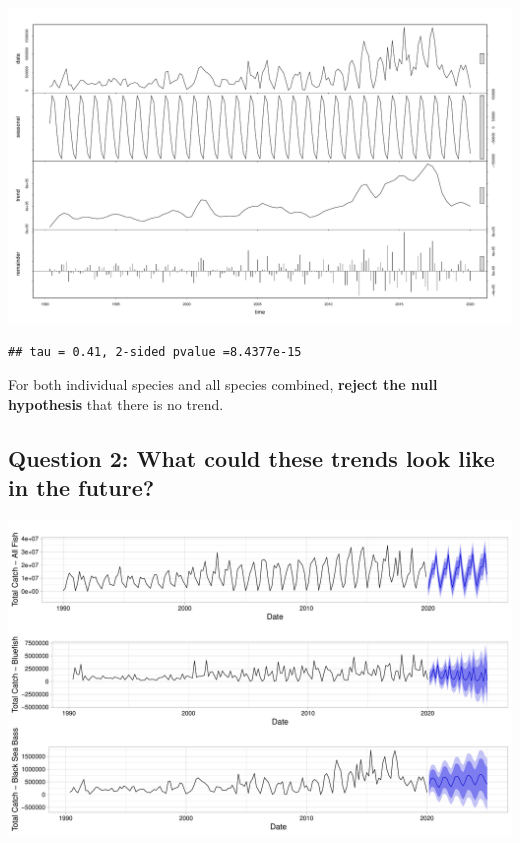 \documentclass[
  12pt,
]{article}
\begin{document}
\includegraphics{Report_FishTrends_files/figure-latex/unnamed-chunk-5-1.pdf}

\begin{verbatim}
## tau = 0.41, 2-sided pvalue =8.4377e-15
\end{verbatim}

For both individual species and all species combined, \textbf{reject the
null hypothesis} that there is no trend.

\hypertarget{question-2-what-could-these-trends-look-like-in-the-future}{%
\subsection{Question 2: What could these trends look like in the
future?}\label{question-2-what-could-these-trends-look-like-in-the-future}}

\includegraphics{Report_FishTrends_files/figure-latex/unnamed-chunk-7-1.pdf}

\newpage
\end{document}
